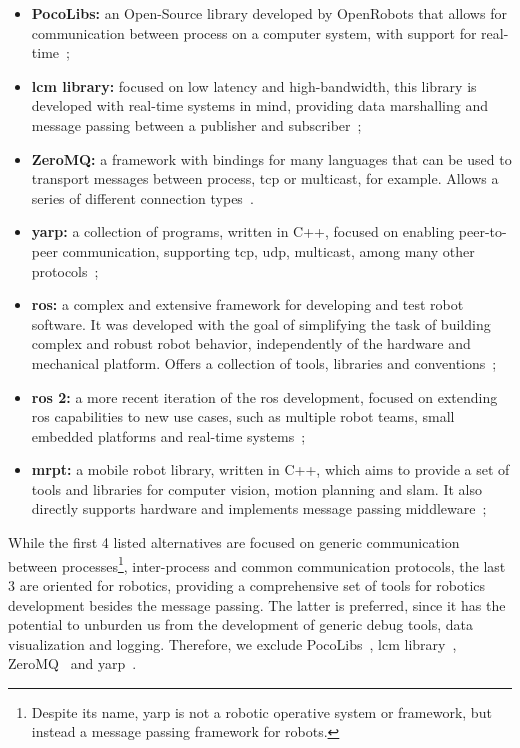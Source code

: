 \begin{itemize}
	\item \textbf{PocoLibs:} an Open-Source library developed by OpenRobots that allows for communication between process on a computer system, with support for real-time~\cite{Pocolibs};
	\item \textbf{\ac{lcm} library:} focused on low latency and high-bandwidth, this library is developed with real-time systems in mind, providing data marshalling and message passing between a publisher and subscriber~\cite{Huang2010b};
	\item \textbf{ZeroMQ:} a framework with bindings for many languages that can be used to transport messages between process, \ac{tcp} or multicast, for example. Allows a series of different connection types~\cite{ZeroMQ}.
	\item \textbf{\ac{yarp}:} a collection of programs, written in C++, focused on enabling peer-to-peer communication, supporting \ac{tcp}, \ac{udp}, multicast, among many other protocols~\cite{Metta2006};
	\item \textbf{\ac{ros}:} a complex and extensive framework for developing and test robot software. It was developed with the goal of simplifying the task of building complex and robust robot behavior, independently of the hardware and mechanical platform. Offers a collection of tools, libraries and conventions~\cite{ROS};
	\item \textbf{\ac{ros} 2:} a more recent iteration of the \ac{ros} development, focused on extending \ac{ros} capabilities to new use cases, such as multiple robot teams, small embedded platforms and real-time systems~\cite{ROS2};
	\item \textbf{\ac{mrpt}:} a mobile robot library, written in C++, which aims to provide a set of tools and libraries for computer vision, motion planning and \ac{slam}. It also directly supports hardware and implements message passing middleware~\cite{MRPT};
\end{itemize}

While the first 4 listed alternatives are focused on generic communication between processes\footnote{Despite its name, \acf{yarp} is not a robotic operative system or framework, but instead a message passing framework for robots.}, inter-process and common communication protocols, the last 3 are oriented for robotics, providing a comprehensive set of tools for robotics development besides the message passing. The latter is preferred, since it has the potential to unburden us from the development of generic debug tools, data visualization and logging. Therefore, we exclude PocoLibs~\cite{Pocolibs}, \ac{lcm} library~\cite{Huang2010b}, ZeroMQ~\cite{ZeroMQ} and \ac{yarp}~\cite{Metta2006}.

